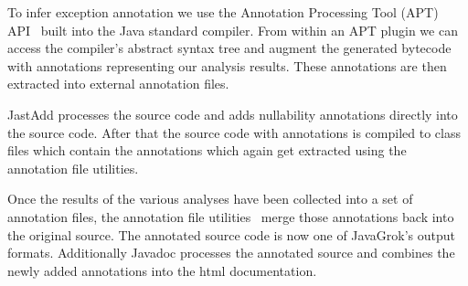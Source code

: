 To infer exception annotation we use the Annotation Processing Tool (APT)
API~\cite{apt} built into the Java standard compiler.
From within an APT plugin
we can access the compiler's abstract syntax tree and augment the generated
bytecode with annotations representing our analysis results. These annotations
are then extracted into external annotation files.

JastAdd processes the source code and adds nullability annotations
directly into the source code. After that the source code with annotations
is compiled to class files which contain the annotations which again 
get extracted using the annotation file utilities.

Once the results of the various analyses have been collected into a set of
annotation files, the annotation file utilities~\cite{AFU} merge
those annotations back into the original source. The annotated source
code is now one of JavaGrok's output formats. Additionally Javadoc processes
the annotated source and combines the newly added annotations into the html
documentation.
